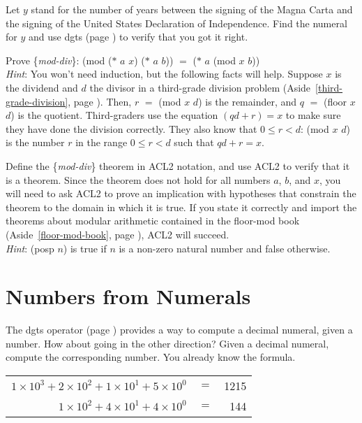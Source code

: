 \begin{ExerciseList}
\Exercise Let $y$ stand for the number of years
between the signing of the Magna Carta and
the signing of the United States Declaration of Independence.
Find the numeral for $y$ and use \textsf{dgts} (page \pageref{dgts-defun})
to verify that you got it right.

\Exercise \label{modular-division}
Prove \{\emph{mod-div}\}:
\textsf{(mod ($*$ $a$ $x$) ($*$ $a$ $b$))} $=$ \textsf{($*$ $a$ (mod $x$ $b$))} \\
\emph{Hint}: You won't need induction, but the following facts will help.
Suppose $x$ is the dividend and $d$ the divisor
in a third-grade division problem
(Aside~\ref{third-grade-division}, page \pageref{third-grade-division}).
Then, $r$ $=$ \textsf{(mod $x$ $d$)} is the remainder,
and $q$ $=$ \textsf{(floor $x$ $d$)} is the quotient.
Third-graders use the equation $(qd + r) = x$
to make sure they have done the division correctly.
They also know that $0 \le r < d$:
\textsf{(mod $x$ $d$)} is the number $r$
in the range $0 \le r < d$ such that $qd + r = x$.

\Exercise \label{mod-div-defthm}Define
the \{\emph{mod-div}\} theorem
in ACL2 notation, and use ACL2 to verify that it is a theorem.
Since the theorem does not hold for all numbers $a$, $b$, and $x$,
you will need to ask ACL2 to prove an implication with
hypotheses that constrain the theorem to the domain in which it is true.
If you state it correctly and import the
theorems about modular arithmetic contained in the floor-mod book
(Aside~\ref{floor-mod-book}, page \pageref{floor-mod-book}),
ACL2 will succeed.\\
\emph{Hint}: \textsf{(posp $n$)} is true if $n$ is a non-zero natural number and false otherwise.
\end{ExerciseList}

\section{Numbers from Numerals}
\label{sec:numbers-from-numerals}
The \textsf{dgts} operator (page \pageref{dgts-defun})
provides a way to compute a decimal
numeral, given a number. How about going in the other direction?
Given a decimal numeral, compute the corresponding number.
You already know the formula.
\begin{samepage}
\begin{center}
\begin{tabular}{rrr}
$1 \times 10^3 + 2 \times 10^2 + 1 \times 10^1 + 5 \times 10^0$ &$=$ & 1215 \\
$1 \times 10^2 + 4 \times 10^1 + 4 \times 10^0$                 &$=$ &  144 \\
\end{tabular}
\end{center}
\end{samepage}

